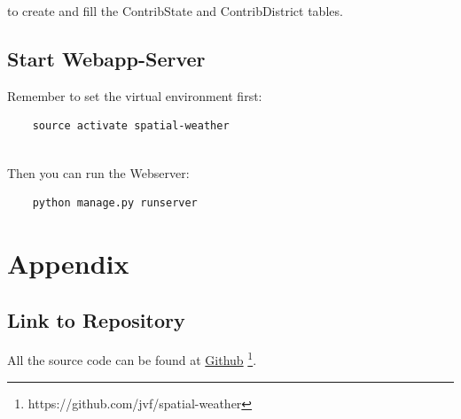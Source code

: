 \documentclass[paper=a4, fontsize=11pt]{article} %
\numberwithin{equation}{section} %
\numberwithin{figure}{section} %
\numberwithin{table}{section} %
\begin{document}
to create and fill the ContribState and ContribDistrict tables.


\subsection{Start Webapp-Server}

Remember to set the virtual environment first:

\begin{lstlisting}
	source activate spatial-weather
\end{lstlisting}

\ \\
Then you can run the Webserver:
\begin{lstlisting}
	python manage.py runserver
\end{lstlisting}


\clearpage
\printbibliography[heading=bibintoc, title=Bibliography]

\clearpage
\section{Appendix}

\subsection{Link to Repository}

All the source code can be found at \href{https://github.com/jvf/spatial-weather}{Github} \footnote{https://github.com/jvf/spatial-weather}.
\end{document}
